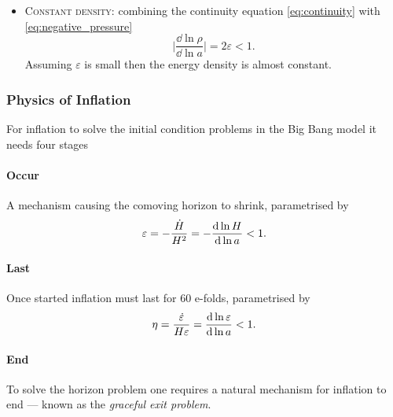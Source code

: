 \begin{itemize}
	\item \textsc{Constant density}:
	      combining the continuity equation \cref{eq:continuity} with \cref{eq:negative_pressure}
	      \begin{equation}
		      \bigg\lvert\frac{\dd{\ln{\rho}}}{\dd{\ln{a}}}\bigg\rvert
		      = 2\varepsilon
		      < 1.
	      \end{equation}
	      Assuming \({\varepsilon}\) is small then the energy density is almost constant.
\end{itemize}

\subsubsection{Physics of Inflation}

For inflation to solve the initial condition problems in the Big Bang model it needs four stages

\paragraph{Occur} A mechanism causing the comoving horizon to shrink, parametrised by
%
\begin{equation}
	\varepsilon
	= -\frac{\dot{H}}{H^{2}}
	= -\dv{\ln{H}}{\ln{a}}
	< 1.
\end{equation}

\paragraph{Last}

Once started inflation must last for 60 e-folds, parametrised by
%
\begin{equation}
	\eta
	= \frac{\dot{\varepsilon}}{H\varepsilon}
	= \dv{\ln{\varepsilon}}{\ln{a}}
	< 1.
\end{equation}

\paragraph{End}

To solve the horizon problem one requires a natural mechanism for inflation to end --- known as the \emph{graceful exit problem}.

